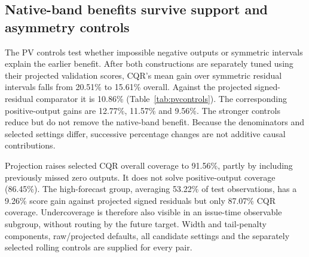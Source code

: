 \subsection{Native-band benefits survive support and asymmetry controls}\label{sec:pvnew}
The PV controls test whether impossible negative outputs or symmetric intervals explain
the earlier benefit. After both constructions are separately tuned using their projected
validation scores, CQR's mean gain over symmetric residual intervals falls from 20.51\%
to 15.61\% overall. Against the projected signed-residual comparator it is 10.86\%
(Table~\ref{tab:pvcontrols}). The corresponding positive-output gains are 12.77\%,
11.57\% and 9.56\%. The stronger controls reduce but do not remove the native-band
benefit. Because the denominators and selected settings differ, successive percentage
changes are not additive causal contributions.

\begin{table}[!htbp]\centering\scriptsize
\caption{PV construction controls, 32 pairs, validation-tuned settings. Gains are
paired CQR improvements over the named baseline (\%); coverages are percent. High
forecast denotes the fixed prefix-median point-forecast split, known at issue time.}
\label{tab:pvcontrols}
\end{table}

Projection raises selected CQR overall coverage to 91.56\%, partly by including
previously missed zero outputs. It does not solve positive-output coverage (86.45\%).
The high-forecast group, averaging 53.22\% of test observations, has a 9.26\% score gain
against projected signed residuals but only 87.07\% CQR coverage. Undercoverage is
therefore also visible in an issue-time observable subgroup, without routing by the
future target. Width and tail-penalty components, raw/projected defaults, all candidate
settings and the separately selected rolling controls are supplied for every pair.
